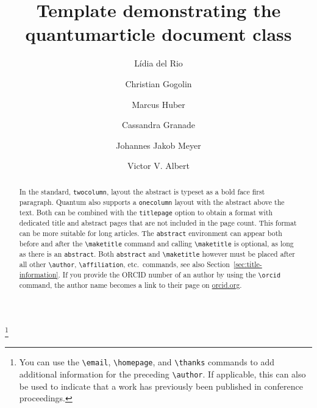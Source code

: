 \documentclass[a4paper,twocolumn,11pt]{quantumarticle}
\begin{document}
\title{Template demonstrating the quantumarticle document class}

\author{Lídia del Rio}
\author{Christian Gogolin}
\thanks{You can use the \texttt{\textbackslash{}email}, \texttt{\textbackslash{}homepage}, and \texttt{\textbackslash{}thanks} commands to add additional information for the preceding \texttt{\textbackslash{}author}. If applicable, this can also be used to indicate that a work has previously been published in conference proceedings.}
\author{Marcus Huber}
\author{Cassandra Granade}
\author{Johannes Jakob Meyer}
\author{Victor V. Albert}
\maketitle

\begin{abstract}
  In the standard, \texttt{twocolumn}, layout the abstract is typeset as a bold face first paragraph.
  Quantum also supports a \texttt{onecolumn} layout with the abstract above the text.
  Both can be combined with the \texttt{titlepage} option to obtain a format with dedicated title and abstract pages that are not included in the page count.
  This format can be more suitable for long articles.
  The \texttt{abstract} environment can appear both before and after the \texttt{\textbackslash{}maketitle} command and calling \texttt{\textbackslash{}maketitle} is optional, as long as there is an \texttt{abstract}.
  Both \texttt{abstract} and \texttt{\textbackslash{}maketitle} however must be placed after all other \texttt{\textbackslash{}author}, \texttt{\textbackslash{}affiliation}, etc.\ commands, see also Section~\ref{sec:title-information}.
  If you provide the ORCID number of an author by using the \texttt{\textbackslash{}orcid} command, the author name becomes a link to their page on \href{http://orcid.org/}{orcid.org}.
\end{abstract}
\end{document}
